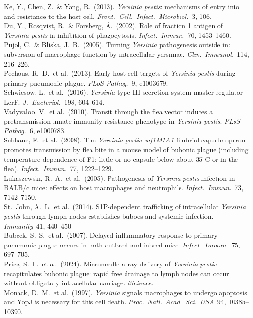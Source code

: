 \documentclass[11pt,a4paper]{article}
\begin{document}
\noindent
Ke, Y., Chen, Z.\ \& Yang, R.\ (2013). \textit{Yersinia pestis}: mechanisms of entry into and resistance to the host cell. \textit{Front.\ Cell.\ Infect.\ Microbiol.}\ 3, 106.\\
Du, Y., Rosqvist, R.\ \& Forsberg, \AA.\ (2002). Role of fraction 1 antigen of \textit{Yersinia pestis} in inhibition of phagocytosis. \textit{Infect.\ Immun.}\ 70, 1453--1460.\\
Pujol, C.\ \& Bliska, J.\ B.\ (2005). Turning \textit{Yersinia} pathogenesis outside in: subversion of macrophage function by intracellular yersiniae. \textit{Clin.\ Immunol.}\ 114, 216--226.\\
Pechous, R.\ D.\ et al.\ (2013). Early host cell targets of \textit{Yersinia pestis} during primary pneumonic plague. \textit{PLoS Pathog.}\ 9, e1003679.\\
Schwiesow, L.\ et al.\ (2016). \textit{Yersinia} type III secretion system master regulator LcrF. \textit{J.\ Bacteriol.}\ 198, 604--614.\\
Vadyvaloo, V.\ et al.\ (2010). Transit through the flea vector induces a pretransmission innate immunity resistance phenotype in \textit{Yersinia pestis}. \textit{PLoS Pathog.}\ 6, e1000783.\\
Sebbane, F.\ et al.\ (2008). The \textit{Yersinia pestis caf1M1A1} fimbrial capsule operon promotes transmission by flea bite in a mouse model of bubonic plague (including temperature dependence of F1: little or no capsule below about $35^\circ\mathrm{C}$ or in the flea). \textit{Infect.\ Immun.}\ 77, 1222--1229.\\
Lukaszewski, R.\ A.\ et al.\ (2005). Pathogenesis of \textit{Yersinia pestis} infection in BALB/c mice: effects on host macrophages and neutrophils. \textit{Infect.\ Immun.}\ 73, 7142--7150.\\
St.\ John, A.\ L.\ et al.\ (2014). S1P-dependent trafficking of intracellular \textit{Yersinia pestis} through lymph nodes establishes buboes and systemic infection. \textit{Immunity}\ 41, 440--450.\\
Bubeck, S.\ S.\ et al.\ (2007). Delayed inflammatory response to primary pneumonic plague occurs in both outbred and inbred mice. \textit{Infect.\ Immun.}\ 75, 697--705.\\
Price, S.\ L.\ et al.\ (2024). Microneedle array delivery of \textit{Yersinia pestis} recapitulates bubonic plague: rapid free drainage to lymph nodes can occur without obligatory intracellular carriage. \textit{iScience}.\\
Monack, D.\ M.\ et al.\ (1997). \textit{Yersinia} signals macrophages to undergo apoptosis and YopJ is necessary for this cell death. \textit{Proc.\ Natl.\ Acad.\ Sci.\ USA}\ 94, 10385--10390.\\
\end{document}
